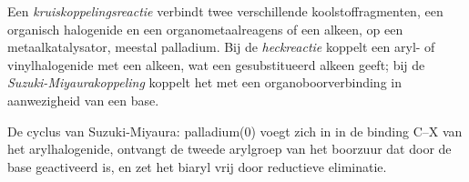 \begin{definition}[Kruiskoppelingsreacties]\label{def:b3:homogeneous-catalysis:cross-coupling}
Een \emph{kruiskoppelingsreactie} verbindt
twee verschillende koolstoffragmenten, een organisch halogenide en een
organometaalreagens of een alkeen, op een metaalkatalysator, meestal
palladium. Bij de
\emph{heckreactie} koppelt een aryl- of vinylhalogenide
met een alkeen, wat een gesubstitueerd alkeen geeft; bij de
\emph{Suzuki-Miyaurakoppeling} koppelt het
met een organoboorverbinding in aanwezigheid van een base.
\end{definition}

\begin{omfigure}

{\small De cyclus van Suzuki-Miyaura: palladium(0) voegt zich in in de
binding C--X van het arylhalogenide, ontvangt de tweede arylgroep van het
boorzuur dat door de base geactiveerd is, en zet het biaryl vrij door
reductieve eliminatie.}
\end{omfigure}

